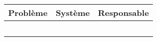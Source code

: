 \Large\begin{tabularx}{\linewidth}{
    |>{\hsize=2.0\hsize}X|%
    >{\hsize=1.2\hsize}X|%
    >{\hsize=0.6\hsize}X|%
  }
    \hline
    Problème & Système & Responsable \\\hline
      &   &   \\\hline
      &   &   \\\hline
      &   &   \\\hline
      &   &   \\\hline
      &   &   \\\hline
  \end{tabularx}
     